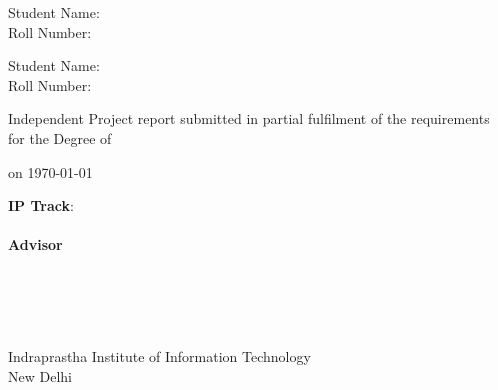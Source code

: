 

\providecommand{\condBreak}[1]{\ifx#1\empty\else \\ \fi }

\begin{titlepage}
    \begin{center}
        {\huge \bf \projTitle}
        \vspace{.3in}

            {\Large{Student Name: \projAuthorOneName}} \\
            {\large{Roll Number: \projAuthorOneRollno}} \\
        \vspace{.1in}

        \ifdefined\twoAuthor
            {\Large{Student Name: \projAuthorTwoName}} \\
            {\large{Roll Number: \projAuthorTwoRollno}} \\
        \fi


        \vspace{1.3in}

        {Independent Project report submitted in partial fulfilment of the requirements
            \\for the Degree of \prog}

        \vspace{.2in}
        {on \today \\}

        \vspace{.65in}

        \textbf{IP Track}: \btptrack\\
        \quad\\

        {\textbf{Advisor} \\
            \advisorone            \condBreak{\advisortwo}
            \advisortwo            \condBreak{\advisorthree}
            \advisorthree          \condBreak{\advisorfour}
            \advisorfour           \\
        }

        \vspace{2.5in}

        {Indraprastha Institute of Information Technology\\
            New Delhi}


    \end{center}
\end{titlepage}